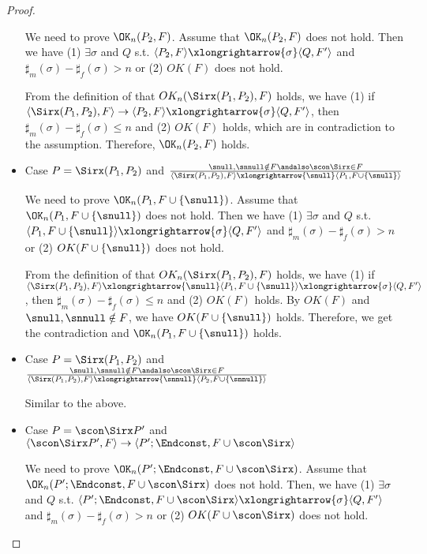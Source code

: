 \begin{proof}
\begin{itemize}
  We need to prove \(\OK_n(P_2, F)\).  Assume that \(\OK_n(P_2, F)\)
  does not hold. Then we have (1) \( \exists \sigma \) and \(Q\)
  s.t. \( \langle P_2, F \rangle \xlongrightarrow{\sigma} \langle Q,
  F' \rangle \) and \(\sharp_{m}(\sigma) - \sharp_{f}(\sigma) > n\) or
  (2) \( OK(F)\) does not hold.

  From the definition of that \(OK_n(\Sirx(P_1, P_2), F)\) holds, we
  have (1) if \( \langle \Sirx(P_1, P_2), F \rangle \rightarrow
  \langle P_2, F \rangle \xlongrightarrow{\sigma} \langle Q, F'
  \rangle \), then \(\sharp_m(\sigma) -
  \sharp_f(\sigma) \le n \) and (2) \(OK(F)\) holds, which are in
  contradiction to the assumption.  Therefore, \(\OK_n(P_2, F)\)
  holds.

 \item Case \( P = \Sirx(P_1,P_2) \) and \( \frac{ \snull,\snnull \notin F
  \andalso \scon\Sirx \in F} { \langle \Sirx(P_1, P_2), F \rangle
  \xlongrightarrow{\snull} \langle P_1, F\cup\{\snull\} \rangle } \)

  We need to prove \(\OK_n(P_1, F\cup\{\snull\})\).  Assume that
  \(\OK_n(P_1, F\cup\{\snull\})\) does not hold. Then we have (1) \(
  \exists \sigma \) and \(Q\) s.t. \( \langle P_1, F\cup\{\snull\}
  \rangle \xlongrightarrow{\sigma} \langle Q, F' \rangle \) and
  \(\sharp_{m}(\sigma) - \sharp_{f}(\sigma) > n\) or (2) \(
  OK(F\cup\{\snull\})\) does not hold.

  From the definition of that \(OK_n(\Sirx(P_1, P_2), F)\) holds, we
  have (1) if \( \langle \Sirx(P_1, P_2), F \rangle \xlongrightarrow{\snull}
  \langle P_1, F\cup\{\snull\} \rangle \xlongrightarrow{\sigma}
  \langle Q, F' \rangle \), then \(\sharp_m(\sigma) - \sharp_f(\sigma)
  \le n \) and (2) \(OK(F)\) holds. By \(OK(F)\) and \(\snull, \snnull
  \notin F \), we have \(OK(F\cup\{\snull\})\) holds.  Therefore, we
  get the contradiction and \(\OK_n(P_1, F\cup\{\snull\})\) holds.

\item Case \( P = \Sirx(P_1,P_2) \) and \( \frac{ \snull,\snnull \notin F
  \andalso \scon\Sirx \in F} { \langle \Sirx(P_1, P_2), F \rangle
  \xlongrightarrow{\snnull} \langle P_2, F\cup\{\snnull\} \rangle } \)

  Similar to the above.
  
\item Case \( P = \scon\Sirx P' \) and \( \langle \scon\Sirx P', F \rangle
  \rightarrow \langle P';\Endconst, F\cup{\scon\Sirx} \rangle  \)

  We need to prove \(\OK_n(P';\Endconst, F\cup{\scon\Sirx})\).  Assume
  that \(\OK_n(P';\Endconst, F\cup{\scon\Sirx})\) does not hold. Then,
  we have (1) \( \exists \sigma \) and \(Q\) s.t. \( \langle
  P';\Endconst, F\cup{\scon\Sirx} \rangle \xlongrightarrow{\sigma}
  \langle Q, F' \rangle \) and \(\sharp_{m}(\sigma) -
  \sharp_{f}(\sigma) > n\) or (2) \( OK(F\cup{\scon\Sirx})\) does not
  hold.


\end{itemize}
\end{proof}
